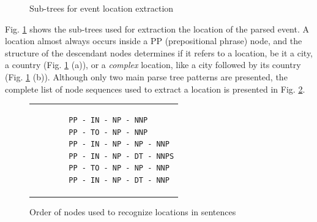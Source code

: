 \documentclass{llncs}
\begin{document}
\begin{figure}[h]
	\centering
	\hspace{20mm}
	\caption{Sub-trees for event location extraction}
	\label{fig:location-extraction}
\end{figure}

Fig. \ref{fig:location-extraction} shows the sub-trees used for extraction the location of the parsed event. A location almost always occurs inside a PP (prepositional phrase) node, and the structure of the descendant nodes determines if it refers to a location, be it a city, a country (Fig. \ref{fig:location-extraction} (a)), or a \textit{complex} location, like a city followed by its country (Fig. \ref{fig:location-extraction} (b)). Although only two main parse tree patterns are presented, the complete list of node sequences used to extract a location is presented in Fig. \ref{fig:nodes-order}.

\begin{figure}[h]
	\centering
	\begin{tabular}{p{4cm}}
		\begin{verbatim}
		PP - IN - NP - NNP
		PP - TO - NP - NNP
		PP - IN - NP - NP - NNP
		PP - IN - NP - DT - NNPS
		PP - TO - NP - NP - NNP
		PP - IN - NP - DT - NNP
		\end{verbatim}
	\end{tabular}
	\caption{Order of nodes used to recognize locations in sentences}
	\label{fig:nodes-order}
\end{figure}
\end{document}

